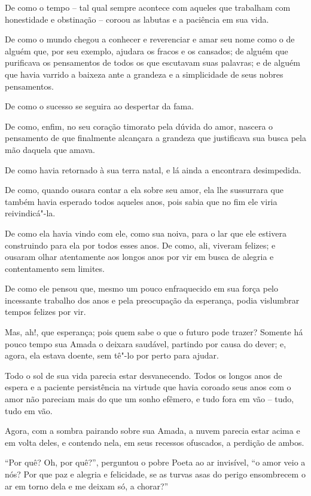 De como o tempo -- tal qual sempre acontece com aqueles que trabalham
com honestidade e obstinação -- coroou as labutas e a paciência em sua
vida.

De como o mundo chegou a conhecer e reverenciar e amar seu nome como o
de alguém que, por seu exemplo, ajudara os fracos e os cansados; de
alguém que purificava os pensamentos de todos os que escutavam suas
palavras; e de alguém que havia varrido a baixeza ante a grandeza e a
simplicidade de seus nobres pensamentos.

De como o sucesso se seguira ao despertar da fama.

De como, enfim, no seu coração timorato pela dúvida do amor, nascera o
pensamento de que finalmente alcançara a grandeza que justificava
sua busca pela mão daquela que amava.

De como havia retornado à sua terra natal, e lá ainda a encontrara
desimpedida.

De como, quando ousara contar a ela sobre seu amor, ela lhe
sussurrara que também havia esperado todos aqueles anos, pois sabia que
no fim ele viria reivindicá"-la.

De como ela havia vindo com ele, como sua noiva, para o lar que ele
estivera construindo para ela por todos esses anos. De como, ali,
viveram felizes; e ousaram olhar atentamente aos longos anos por vir em
busca de alegria e contentamento sem limites.

De como ele pensou que, mesmo um pouco enfraquecido em sua força pelo
incessante trabalho dos anos e pela preocupação da esperança, podia
vislumbrar tempos felizes por vir.

Mas, ah!, que esperança; pois quem sabe o que o futuro pode trazer?
Somente há pouco tempo sua Amada o deixara saudável, partindo por causa
do dever; e, agora, ela estava doente, sem tê"-lo por perto para ajudar.

Todo o sol de sua vida parecia estar desvanecendo. Todos os longos anos
de espera e a paciente persistência na virtude que havia coroado seus
anos com o amor não pareciam mais do que um sonho efêmero, e tudo fora em
vão -- tudo, tudo em vão.

Agora, com a sombra pairando sobre sua Amada, a nuvem parecia estar
acima e em volta deles, e contendo nela, em seus recessos ofuscados, a
perdição de ambos.

``Por quê? Oh, por quê?'', perguntou o pobre Poeta ao ar invisível, ``o
amor veio a nós? Por que paz e alegria e felicidade, se as turvas asas do
perigo ensombrecem o ar em torno dela e me deixam só, a chorar?''

